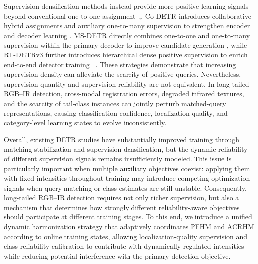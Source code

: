 \documentclass[letterpaper,journal]{IEEEtran}
\begin{document}
Supervision-densification methods instead provide more positive learning signals beyond conventional one-to-one assignment~\cite{hdetr},\cite{group_detr}. Co-DETR introduces collaborative hybrid assignments and auxiliary one-to-many supervision to strengthen encoder and decoder learning \cite{codetr}. MS-DETR directly combines one-to-one and one-to-many supervision within the primary decoder to improve candidate generation \cite{msdetr}, while RT-DETRv3 further introduces hierarchical dense positive supervision to enrich end-to-end detector training \cite{rtdetrv3}~\cite{deim}. These strategies demonstrate that increasing supervision density can alleviate the scarcity of positive queries. Nevertheless, supervision quantity and supervision reliability are not equivalent. In long-tailed RGB--IR detection, cross-modal registration errors, degraded infrared textures, and the scarcity of tail-class instances can jointly perturb matched-query representations, causing classification confidence, localization quality, and category-level learning states to evolve inconsistently.

Overall, existing DETR studies have substantially improved training through matching stabilization and supervision densification, but the dynamic reliability of different supervision signals remains insufficiently modeled. This issue is particularly important when multiple auxiliary objectives coexist: applying them with fixed intensities throughout training may introduce competing optimization signals when query matching or class estimates are still unstable. Consequently, long-tailed RGB--IR detection requires not only richer supervision, but also a mechanism that determines how strongly different reliability-aware objectives should participate at different training stages. To this end, we introduce a unified dynamic harmonization strategy that adaptively coordinates PFHM and ACRHM according to online training states, allowing localization-quality supervision and class-reliability calibration to contribute with dynamically regulated intensities while reducing potential interference with the primary detection objective.
\end{document}

